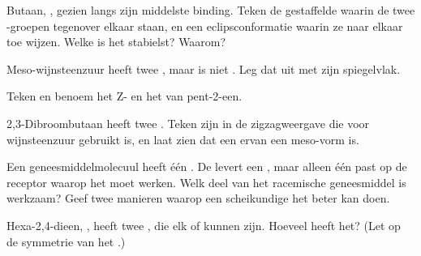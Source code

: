\begin{exercise}[$\star\star$]\label{exo:g12:stereochemistry:9}
Butaan, , gezien langs zijn middelste binding. Teken
de gestaffelde  waarin de twee -groepen tegenover
elkaar staan, en een eclipsconformatie waarin ze naar elkaar toe wijzen.
Welke is het stabielst? Waarom?
\end{exercise}

\begin{exercise}[$\star\star$]\label{exo:g12:stereochemistry:10}
Meso-wijnsteenzuur heeft twee , maar is niet
. Leg dat uit met zijn spiegelvlak.
\end{exercise}

\begin{exercise}[$\star\star$]\label{exo:g12:stereochemistry:11}
Teken en benoem het Z- en het  van pent-2-een.
\end{exercise}

\begin{exercise}[$\star\star\star$]\label{exo:g12:stereochemistry:12}
2,3-Dibroombutaan  heeft twee . Teken zijn  in de zigzagweergave die voor
wijnsteenzuur gebruikt is, en laat zien dat een ervan een meso-vorm is.
\end{exercise}

\begin{exercise}[$\star\star\star$]\label{exo:g12:stereochemistry:13}
Een geneesmiddelmolecuul heeft één . De
 levert een , maar alleen één  past
op de  receptor waarop het moet werken. Welk deel van het
racemische geneesmiddel is werkzaam? Geef twee manieren waarop een
scheikundige het beter kan doen.
\end{exercise}

\begin{exercise}[$\star\star\star$]\label{exo:g12:stereochemistry:14}
Hexa-2,4-dieen, , heeft twee ,
die elk  of  kunnen zijn. Hoeveel  heeft het? (Let op
de symmetrie van het .)
\end{exercise}

